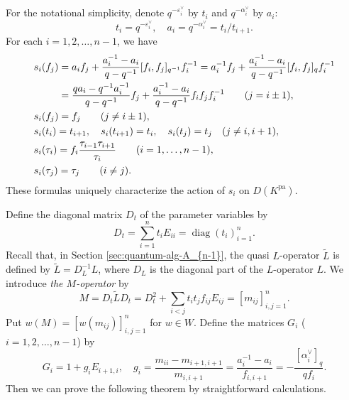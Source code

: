 \documentclass[12pt,twoside]{article}
\newcommand\tL{{\widetilde{L}}}
\newcommand\av{\alpha^\vee}
\newcommand\eps{\varepsilon}
\newcommand\epsv{\eps^\vee}
\newcommand\pa{{\mathrm{pa}}}
\newcommand\diag{\mathop{\mathrm{diag}}\nolimits}
\theoremstyle{plain} %
\theoremstyle{definition} %
\theoremstyle{definition} %
\numberwithin{theorem}{section}
\numberwithin{equation}{section}
\numberwithin{figure}{section}
\numberwithin{table}{section}
\newcommand\secref[1]{Section \ref{#1}}
\begin{document}
For the notational simplicity, denote $q^{-\epsv_i}$ by $t_i$
and $q^{-\av_i}$ by $a_i$:
\begin{equation*}
 t_i = q^{-\epsv_i}, \quad 
 a_i = q^{-\av_i} = t_i/t_{i+1}.
\end{equation*}
For each $i=1,2,\ldots,n-1$, we have
\begin{align}
  &
  s_i(f_j)
  = a_i      f_j + \frac{a_i^{-1}-a_i}{q-q^{-1}} [f_i,f_j]_{q^{-1}} f_i^{-1}
  = a_i^{-1} f_j + \frac{a_i^{-1}-a_i}{q-q^{-1}} [f_i,f_j]_q        f_i^{-1}
 \notag
 \\ &
  \hphantom{s_i(f_j)}
  = \frac{q a_i-q^{-1}a_i^{-1}}{q-q^{-1}} f_j 
  + \frac{a_i^{-1}-a_i}{q-q^{-1}} f_i f_j f_i^{-1}
  \qquad (j=i\pm1), 
 \label{eq:s_i(f_j)-1}
 \\ &
  s_i(f_j) = f_j 
  \qquad (j\ne i\pm 1),
 \label{eq:s_i(f_j)-2}
 \\ &
  s_i(t_i) = t_{i+1}, \quad
  s_i(t_{i+1}) = t_i, \quad
  s_i(t_j) = t_j \quad (j\ne i,i+1),
 \label{eq:s_i(t_j)}
 \\ &
  s_i(\tau_i) 
  = f_i\frac{\tau_{i-1}\tau_{i+1}}{\tau_i} 
  \qquad (i=1,\ldots,n-1),
 \notag
 \\ & 
  s_i(\tau_j) = \tau_j
  \qquad (i\ne j).
 \notag 
\end{align}
These formulas uniquely characterize the action of $s_i$ on $D(K^\pa)$.

Define the diagonal matrix $D_t$ of the parameter variables by 
\begin{equation*}
 D_t = \sum_{i=1}^n t_i E_{ii} = \diag(t_i)_{i=1}^n.
\end{equation*}
Recall that, in \secref{sec:quantum-alg-A_{n-1}}, 
the quasi $L$-operator $\tL$ is defined by $\tL=D_L^{-1}L$, 
where $D_L$ is the diagonal part of the $L$-operator $L$.
We introduce {\em the $M$-operator} by
\begin{equation*}
 M = D_t \tL D_t 
   = D_t^2 + \sum_{i<j}t_i t_j f_{ij}E_{ij}
   = [m_{ij}]_{i,j=1}^n.
\end{equation*}
Put $w(M) = [w(m_{ij})]_{i,j=1}^n$ for $w\in W$.
Define the matrices $G_i$ ($i=1,2,\ldots,n-1$) by
\begin{equation*}
 G_i = 1 + g_i E_{i+1,i}, \quad
 g_i = \frac{m_{ii}-m_{i+1,i+1}}{m_{i,i+1}}
     = \frac{a_i^{-1}-a_i}{f_{i,i+1}}
     = -\frac{[\av_i]_q}{q f_i}.
\end{equation*}
Then we can prove the following theorem by straightforward calculations.
\end{document}
